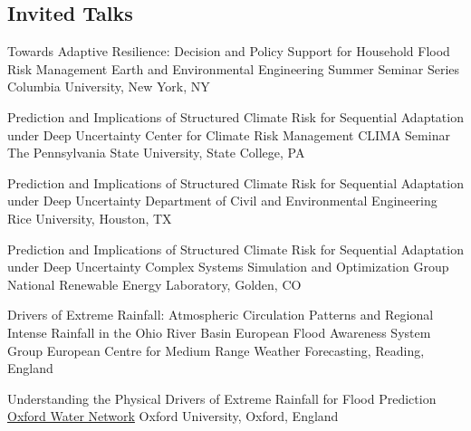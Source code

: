 \subsection{Invited Talks}

{Towards Adaptive Resilience: Decision and Policy Support for Household Flood Risk Management}
{Earth and Environmental Engineering Summer Seminar Series}
{Columbia University, New York, NY}
{}
{}

{Prediction and Implications of Structured Climate Risk for Sequential Adaptation under Deep Uncertainty}
{Center for Climate Risk Management CLIMA Seminar}
{The Pennsylvania State University, State College, PA}
{}
{}

{Prediction and Implications of Structured Climate Risk for Sequential Adaptation under Deep Uncertainty}
{Department of Civil and Environmental Engineering}
{Rice University, Houston, TX}
{}
{}

{Prediction and Implications of Structured Climate Risk for Sequential Adaptation under Deep Uncertainty}
{Complex Systems Simulation and Optimization Group}
{National Renewable Energy Laboratory, Golden, CO}
{}
{}

{Drivers of Extreme Rainfall: Atmospheric  Circulation Patterns and Regional Intense Rainfall in the Ohio River Basin}
{European Flood Awareness System Group}
{European Centre for Medium Range Weather Forecasting, Reading, England}
{}
{}

{Understanding the Physical Drivers of Extreme Rainfall for Flood Prediction}
{\href{https://www.water.ox.ac.uk/understanding-the-physical-drivers-of-extreme-rainfall-for-flood-prediction/}{Oxford Water Network}}
{Oxford University, Oxford, England}
{}
{}
